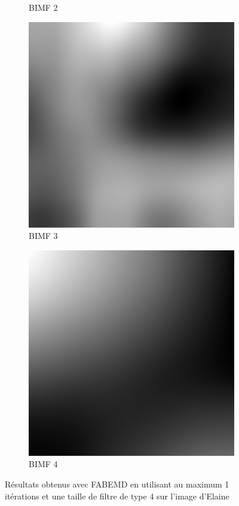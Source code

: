 \begin{figure}
\begin{subfigure}{.30\textwidth}
  \caption{BIMF 2}
\end{subfigure}
\begin{subfigure}{.30\textwidth}
  \centering
  \includegraphics[width=.9\linewidth]{img/e_1_4_3}
  \caption{BIMF 3}
\end{subfigure}
\begin{subfigure}{.30\textwidth}
  \centering
  \includegraphics[width=.9\linewidth]{img/e_1_4_4}
  \caption{BIMF 4}
\end{subfigure}
\caption{Résultats obtenus avec FABEMD en utilisant au maximum 1 itérations et une taille de filtre de type 4 sur l'image d'Elaine}
\label{fig:e_1_4}
\end{figure}

